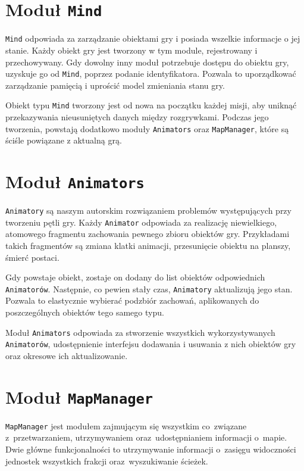 \documentclass[licencjacka]{pracamgr}
\begin{document}
  \section{Moduł \texttt{Mind}}

    \texttt{Mind} odpowiada za zarządzanie obiektami gry i posiada wszelkie informacje o jej stanie. 
    Każdy obiekt gry jest tworzony w tym module, rejestrowany i przechowywany. Gdy dowolny inny moduł potrzebuje dostępu do 
    obiektu gry, uzyskuje go od \texttt{Mind}, poprzez podanie identyfikatora. Pozwala to uporządkować zarządzanie pamięcią
    i uprościć model zmieniania stanu gry. 

    Obiekt typu \texttt{Mind} tworzony jest od nowa na początku każdej misji, aby uniknąć przekazywania nieusuniętych danych
    między rozgrywkami. Podczas jego tworzenia, powstają dodatkowo moduły \texttt{Animators} oraz \texttt{MapManager}, które 
    są ściśle powiązane z aktualną grą. 	
	
  \section{Moduł \texttt{Animators}}
    \texttt{Animatory} są naszym autorskim rozwiązaniem problemów występujących przy tworzeniu pętli gry. Każdy \texttt{Animator}
    odpowiada za realizację niewielkiego, atomowego fragmentu zachowania pewnego zbioru obiektów gry. Przykładami takich
    fragmentów są zmiana klatki animacji, przesunięcie obiektu na planszy, śmierć postaci.
    
    Gdy powstaje obiekt, zostaje on dodany do list obiektów odpowiednich \texttt{Animatorów}. Następnie, co pewien stały czas, 
    \texttt{Animatory} aktualizują jego stan. Pozwala to elastycznie wybierać podzbiór zachowań, aplikowanych do poszczególnych
    obiektów tego samego typu. 
    
    Moduł \texttt{Animators} odpowiada za stworzenie wszystkich wykorzystywanych \texttt{Animatorów}, udostępnienie interfejsu
    dodawania i usuwania z nich obiektów gry oraz okresowe ich aktualizowanie. 
  \section{Moduł \texttt{MapManager}}
    \texttt{MapManager} jest modułem zajmującym się wszystkim co~związane z~przetwarzaniem, utrzymywaniem oraz~udostępnianiem
    informacji o~mapie. Dwie główne funkcjonalności to utrzymywanie informacji o~zasięgu widoczności jednostek wszystkich
    frakcji oraz~wyszukiwanie ścieżek.
\end{document}
